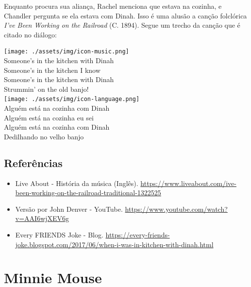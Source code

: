 Enquanto procura sua aliança, Rachel menciona que estava na cozinha, e
Chandler pergunta se ela estava com Dinah. Isso é uma alusão a canção
folclórica \emph{I've Been Working on the Railroad} (C. 1894). Segue um
trecho da canção que é citado no diálogo:

\bigskip
\begin{tcolorbox}[enhanced,
    drop fuzzy shadow southeast, boxrule=0.3pt,
    lower separated=false, sidebyside, sidebyside align=top,
    halign=flush right, halign lower=left,
    colframe=black!30!dialogoBorder,colback=musicaBg]
\texttt{[image: ./assets/img/icon-music.png]}\\
Someone’s in the kitchen with Dinah\\Someone’s in the kitchen I know\\Someone’s in the kitchen with Dinah\\Strummin’ on the old banjo!\\
\tcblower
\texttt{[image: ./assets/img/icon-language.png]}\\
Alguém está na cozinha com Dinah\\Alguém está na cozinha eu sei\\Alguém está na cozinha com Dinah\\Dedilhando no velho banjo\\
\end{tcolorbox}

\hypertarget{referuxeancias-3}{%
\subsection{Referências}\label{referuxeancias-3}}

\begin{itemize}
\tightlist
\item
  \sloppy Live About - História da música (Inglês). \url{https://www.liveabout.com/ive-been-working-on-the-railroad-traditional-1322525}
\item
  \sloppy Versão por John Denver - YouTube. \url{https://www.youtube.com/watch?v=AAI6wjXEV6g}
\item
  \sloppy Every FRIENDS Joke - Blog. \url{https://every-friends-joke.blogspot.com/2017/06/when-i-was-in-kitchen-with-dinah.html}
\end{itemize}

\hypertarget{minnie-mouse}{%
\section{Minnie Mouse}\label{minnie-mouse}}

